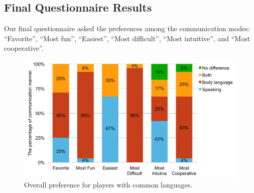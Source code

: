 


\subsection{Final Questionnaire Results}
Our final questionnaire asked the preferences among the communication modes: ``Favorite'', ``Most fun'', ``Easiest'', ``Most difficult'', ``Most intuitive'', and ``Most cooperative''.




\begin{figure}[!t]
\centering
\includegraphics[width=0.9\columnwidth]{Figures/US_FQ_Com.pdf}
\caption{Overall preference for players with common languages.}
\label{fig:US_FQ_Com}
\end{figure}


